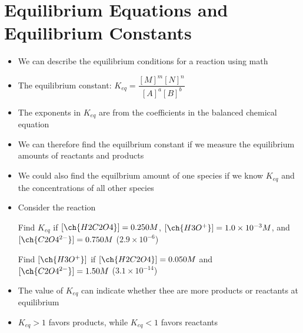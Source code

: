 \documentclass[12pt, openany, letterpaper]{memoir}
\begin{document}
\section{Equilibrium Equations and Equilibrium Constants}
\begin{itemize}
	\item We can describe the equilibrium conditions for a reaction using math
	\item The equilibrium constant: $K_{eq}=\dfrac{[M]^m[N]^n}{[A]^a[B]^b}$
	\item The exponents in $K_{eq}$ are from the coefficients in the balanced chemical equation
	\item We can therefore find the equilbrium constant if we measure the equilibrium amounts of reactants and products
	\item We could also find the equilbrium amount of one species if we know $K_{eq}$ and the concentrations of all other species
  \item Consider the reaction 

    Find $K_{eq}$ if $[\ch{H2C2O4}]=0.250M$, $[\ch{H3O^+}]=1.0\times10^{-3}M$, and $[\ch{C2O4^{2-}}]=0.750M$ \hspace{1em} ($2.9\times10^{-6}$)

    Find $[\ch{H3O^+}]$ if $[\ch{H2C2O4}]=0.050M$ and $[\ch{C2O4^{2-}}]=1.50M$ \hspace{1em} ($3.1\times10^{-14}$)
	\item The value of $K_{eq}$ can indicate whether thee are more products or reactants at equilibrium
	\item $K_{eq}>1$ favors products, while $K_{eq}<1$ favors reactants
\end{itemize}
\end{document}
